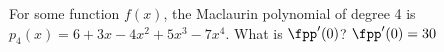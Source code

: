 {For some function $f(x)$, the Maclaurin polynomial of degree 4 is $p_4(x) = 6+3x-4x^2+5x^3-7x^4$. What is $\fpp'(0)$?
}
{$\fpp'(0)=30$
}